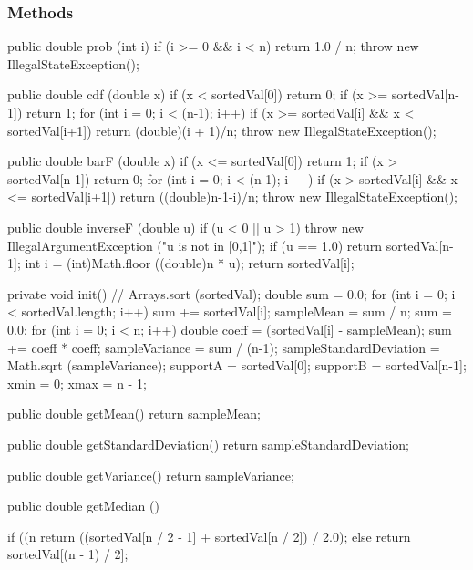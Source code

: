 \subsubsection* {Methods}
\begin{code}\begin{hide}

   public double prob (int i) {
      if (i >= 0 && i < n)
         return 1.0 / n;
      throw new IllegalStateException();
   }

   public double cdf (double x) {
      if (x < sortedVal[0])
         return 0;
      if (x >= sortedVal[n-1])
         return 1;
      for (int i = 0; i < (n-1); i++) {
         if (x >= sortedVal[i] && x < sortedVal[i+1])
            return (double)(i + 1)/n;
      }
      throw new IllegalStateException();
   }

   public double barF (double x) {
      if (x <= sortedVal[0])
         return 1;
      if (x > sortedVal[n-1])
         return 0;
      for (int i = 0; i < (n-1); i++) {
         if (x > sortedVal[i] && x <= sortedVal[i+1])
            return ((double)n-1-i)/n;
      }
      throw new IllegalStateException();
   }

   public double inverseF (double u) {
      if (u < 0 || u > 1)
         throw new IllegalArgumentException ("u is not in [0,1]");
      if (u == 1.0)
         return sortedVal[n-1];
      int i = (int)Math.floor ((double)n * u);
      return sortedVal[i];
   }

   private void init() {
      // Arrays.sort (sortedVal);
      double sum = 0.0;
      for (int i = 0; i < sortedVal.length; i++) {
         sum += sortedVal[i];
      }
      sampleMean = sum / n;
      sum = 0.0;
      for (int i = 0; i < n; i++) {
         double coeff = (sortedVal[i] - sampleMean);
         sum += coeff * coeff;
      }
      sampleVariance = sum / (n-1);
      sampleStandardDeviation = Math.sqrt (sampleVariance);
      supportA = sortedVal[0];
      supportB = sortedVal[n-1];
      xmin = 0;
      xmax = n - 1;
   }

   public double getMean() {
      return sampleMean;
   }

   public double getStandardDeviation() {
      return sampleStandardDeviation;
   }

   public double getVariance() {
      return sampleVariance;
   }\end{hide}

   public double getMedian ()\begin{hide} {
      if ((n %
         return ((sortedVal[n / 2 - 1] + sortedVal[n / 2]) / 2.0);
      else
         return sortedVal[(n - 1) / 2];
   }\end{hide}
\end{code}
